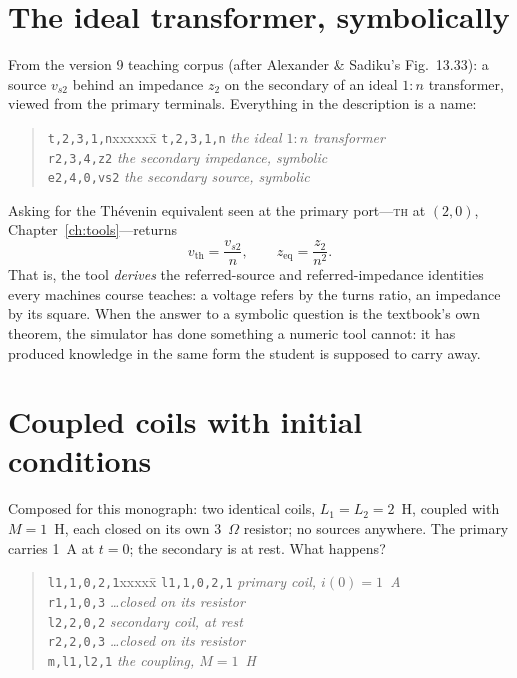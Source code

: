 \documentclass[11pt,oneside]{report}
\newcommand{\kw}[1]{\textsc{#1}}
\newcommand{\code}[1]{\texttt{#1}}
\begin{document}
\section{The ideal transformer, symbolically}
\label{sec:transformer}

From the version 9 teaching corpus (after Alexander \& Sadiku's
Fig.~13.33): a source $v_{s2}$ behind an impedance $z_2$ on the
secondary of an ideal $1\!:\!n$ transformer, viewed from the primary
terminals. Everything in the description is a name:

\begin{quote}
\begin{tabbing}
\code{t,2,3,1,n}xxxxxx\=\kill
\code{t,2,3,1,n}        \> \emph{the ideal $1\!:\!n$ transformer} \\
\code{r2,3,4,z2}        \> \emph{the secondary impedance, symbolic} \\
\code{e2,4,0,vs2}       \> \emph{the secondary source, symbolic}
\end{tabbing}
\end{quote}

\noindent Asking for the Th\'evenin equivalent seen at the primary
port---\kw{th} at $(2, 0)$, Chapter~\ref{ch:tools}---returns
\[
v_\mathrm{th} = \frac{v_{s2}}{n}, \qquad
z_\mathrm{eq} = \frac{z_2}{n^2}.
\]
That is, the tool \emph{derives} the referred-source and
referred-impedance identities every machines course teaches: a
voltage refers by the turns ratio, an impedance by its square. When
the answer to a symbolic question is the textbook's own theorem, the
simulator has done something a numeric tool cannot: it has produced
knowledge in the same form the student is supposed to carry away.

\section{Coupled coils with initial conditions}
\label{sec:coupledcoils}

Composed for this monograph: two identical coils, $L_1 = L_2 = 2$~H,
coupled with $M = 1$~H, each closed on its own 3~$\Omega$ resistor;
no sources anywhere. The primary carries 1~A at $t=0$; the secondary
is at rest. What happens?

\begin{quote}
\begin{tabbing}
\code{l1,1,0,2,1}xxxxx\=\kill
\code{l1,1,0,2,1}       \> \emph{primary coil, $i(0) = 1$~A} \\
\code{r1,1,0,3}         \> \emph{\ldots closed on its resistor} \\
\code{l2,2,0,2}         \> \emph{secondary coil, at rest} \\
\code{r2,2,0,3}         \> \emph{\ldots closed on its resistor} \\
\code{m,l1,l2,1}        \> \emph{the coupling, $M = 1$~H}
\end{tabbing}
\end{quote}
\end{document}
